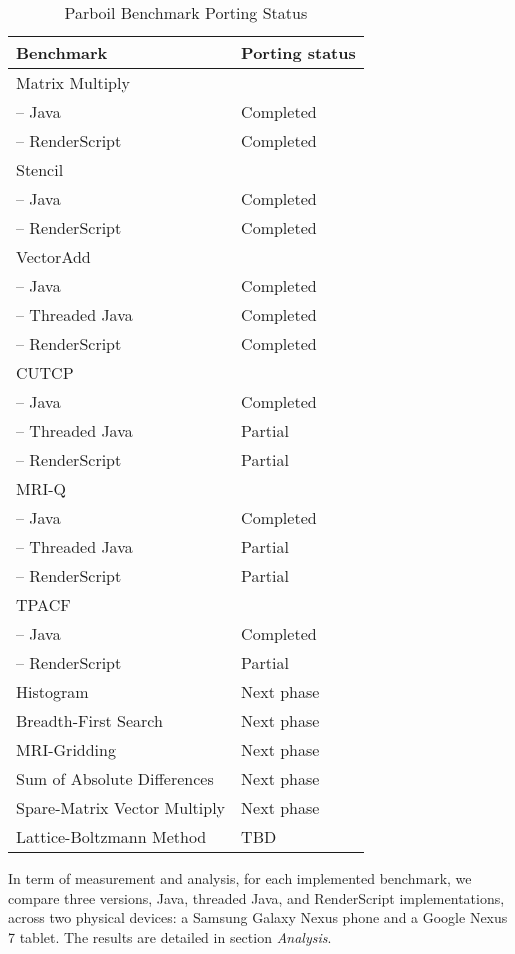 \begin{table}[h]\small
\centering
\begin{tabular}{ | l | p{2cm} |}
    \hline 
    Benchmark & Porting status \\ \hline
    Matrix Multiply & \\
    \hspace{0.5cm}-- Java & Completed \\
    \hspace{0.5cm}-- RenderScript & Completed \\ \hline
    Stencil & \\
    \hspace{0.5cm}-- Java & Completed \\
    \hspace{0.5cm}-- RenderScript & Completed \\ \hline
    VectorAdd & \\
    \hspace{0.5cm}-- Java & Completed \\
    \hspace{0.5cm}-- Threaded Java & Completed \\
    \hspace{0.5cm}-- RenderScript & Completed \\ \hline
    CUTCP & \\
    \hspace{0.5cm}-- Java & Completed \\
    \hspace{0.5cm}-- Threaded Java & Partial \\
    \hspace{0.5cm}-- RenderScript & Partial \\ \hline
    MRI-Q & \\
    \hspace{0.5cm}-- Java & Completed \\
    \hspace{0.5cm}-- Threaded Java & Partial \\
    \hspace{0.5cm}-- RenderScript & Partial \\ \hline
    TPACF & \\
    \hspace{0.5cm}-- Java & Completed \\
    \hspace{0.5cm}-- RenderScript & Partial \\ \hline  
    Histogram & Next phase \\ \hline
    Breadth-First Search & Next phase\\ \hline
    MRI-Gridding & Next phase \\ \hline
    Sum of Absolute Differences & Next phase \\ \hline
    Spare-Matrix Vector Multiply & Next phase \\ \hline
    Lattice-Boltzmann Method & TBD \\ \hline
    \hline
\end{tabular}
\caption{Parboil Benchmark Porting Status}
\label{table:parboil}
\end{table}

In term of measurement and analysis, for each implemented benchmark, we compare
three versions, Java, threaded Java, and RenderScript implementations, across
two physical devices: a Samsung Galaxy Nexus phone and a Google Nexus 7 tablet.
The results are detailed in section {\em Analysis}.

